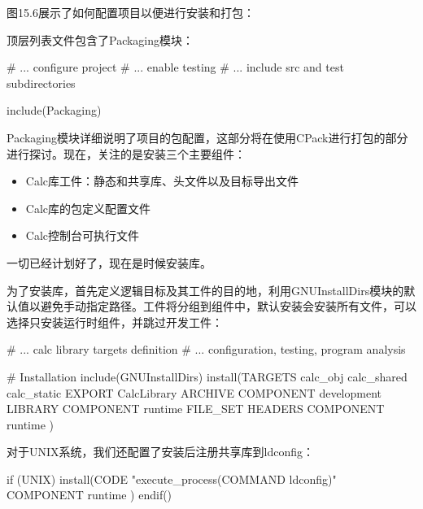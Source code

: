 
图15.6展示了如何配置项目以便进行安装和打包：


顶层列表文件包含了Packaging模块：


\begin{cmake}
# ... configure project
# ... enable testing
# ... include src and test subdirectories

include(Packaging)
\end{cmake}

Packaging模块详细说明了项目的包配置，这部分将在使用CPack进行打包的部分进行探讨。现在，关注的是安装三个主要组件：

\begin{itemize}
\item
Calc库工件：静态和共享库、头文件以及目标导出文件

\item
Calc库的包定义配置文件

\item
Calc控制台可执行文件
\end{itemize}

一切已经计划好了，现在是时候安装库。


为了安装库，首先定义逻辑目标及其工件的目的地，利用GNUInstallDirs模块的默认值以避免手动指定路径。工件将分组到组件中，默认安装会安装所有文件，可以选择只安装运行时组件，并跳过开发工件：


\begin{cmake}
# ... calc library targets definition
# ... configuration, testing, program analysis

# Installation
include(GNUInstallDirs)
install(TARGETS calc_obj calc_shared calc_static
    EXPORT CalcLibrary
    ARCHIVE COMPONENT development
    LIBRARY COMPONENT runtime
    FILE_SET HEADERS COMPONENT runtime
)
\end{cmake}

对于UNIX系统，我们还配置了安装后注册共享库到ldconfig：


\begin{cmake}
if (UNIX)
    install(CODE "execute_process(COMMAND ldconfig)"
        COMPONENT runtime
    )
endif()
\end{cmake}


